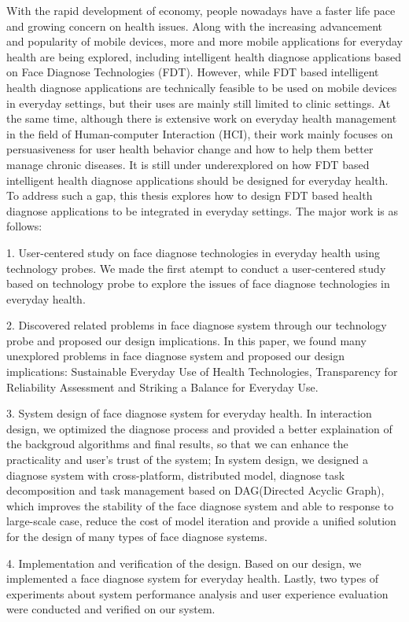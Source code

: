 \documentclass[oneside,type=master]{fduthesis}
\begin{document}
\begin{abstract*}

With the rapid development of economy, people nowadays have a faster life pace and growing concern on health issues. 
Along with the increasing advancement and popularity of mobile devices, more and more mobile applications for everyday health are being explored, including intelligent health diagnose applications based on Face Diagnose Technologies (FDT). However, while FDT based intelligent health diagnose applications are technically feasible to be used on mobile devices in everyday settings, but their uses are mainly still limited to clinic settings. At the same time, although there is extensive work on everyday health management in the field of Human-computer Interaction (HCI), their work mainly focuses on persuasiveness for user health behavior change and how to help them better manage chronic diseases. It is still under underexplored on how FDT based intelligent health diagnose applications should be designed for everyday health.
To address such a gap, this thesis explores how to design FDT based health diagnose applications to be integrated in everyday settings. The major work is as follows: 

1. User-centered study on face diagnose technologies in everyday health using technology probes.
We made the first atempt to conduct a user-centered study based on technology probe to explore the issues of face diagnose technologies in everyday health.

2. Discovered related problems in face diagnose system through our technology probe and proposed our design implications.
In this paper, we found many unexplored problems in face diagnose system and proposed our design implications: Sustainable Everyday Use of Health Technologies, Transparency for Reliability Assessment and Striking a Balance for Everyday Use. 

3. System design of face diagnose system for everyday health.
In interaction design, we optimized the diagnose process and provided a better explaination of the backgroud algorithms and final results, so that we can enhance the practicality and user's trust of the system;
In system design, we designed a diagnose system with cross-platform, distributed model, diagnose task decomposition and task management based on DAG(Directed Acyclic Graph), which improves the stability of the face diagnose system and able to response to large-scale case, reduce the cost of model iteration and provide a unified solution for the design of many types of face diagnose systems.

4. Implementation and verification of the design.
Based on our design, we implemented a face diagnose system for everyday health. Lastly, two types of experiments about system performance analysis and user experience evaluation were conducted and verified on our system.


\end{abstract*}
\end{document}
